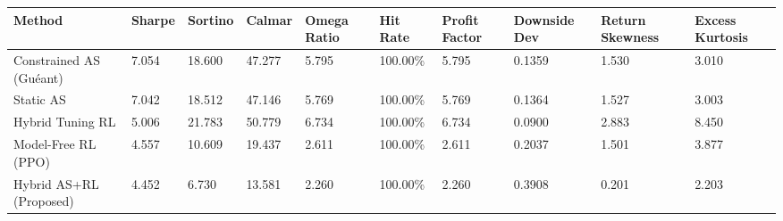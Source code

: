 \begin{tabular}{llllllllll}
\toprule
Method & Sharpe & Sortino & Calmar & Omega Ratio & Hit Rate & Profit Factor & Downside Dev & Return Skewness & Excess Kurtosis \\
\midrule
Constrained AS (Guéant) & 7.054 & 18.600 & 47.277 & 5.795 & 100.00\% & 5.795 & 0.1359 & 1.530 & 3.010 \\
Static AS & 7.042 & 18.512 & 47.146 & 5.769 & 100.00\% & 5.769 & 0.1364 & 1.527 & 3.003 \\
Hybrid Tuning RL & 5.006 & 21.783 & 50.779 & 6.734 & 100.00\% & 6.734 & 0.0900 & 2.883 & 8.450 \\
Model-Free RL (PPO) & 4.557 & 10.609 & 19.437 & 2.611 & 100.00\% & 2.611 & 0.2037 & 1.501 & 3.877 \\
Hybrid AS+RL (Proposed) & 4.452 & 6.730 & 13.581 & 2.260 & 100.00\% & 2.260 & 0.3908 & 0.201 & 2.203 \\
\bottomrule
\end{tabular}
